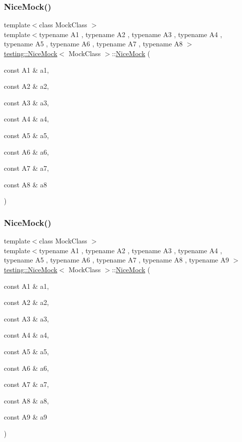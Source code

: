 \subsubsection{\texorpdfstring{Nice\+Mock()}{NiceMock()}\hspace{0.1cm}{\footnotesize\ttfamily [9/11]}}
{\footnotesize\ttfamily template$<$class Mock\+Class $>$ \\
template$<$typename A1 , typename A2 , typename A3 , typename A4 , typename A5 , typename A6 , typename A7 , typename A8 $>$ \\
\hyperlink{classtesting_1_1_nice_mock}{testing\+::\+Nice\+Mock}$<$ Mock\+Class $>$\+::\hyperlink{classtesting_1_1_nice_mock}{Nice\+Mock} (\begin{DoxyParamCaption}\item[{const A1 \&}]{a1,  }\item[{const A2 \&}]{a2,  }\item[{const A3 \&}]{a3,  }\item[{const A4 \&}]{a4,  }\item[{const A5 \&}]{a5,  }\item[{const A6 \&}]{a6,  }\item[{const A7 \&}]{a7,  }\item[{const A8 \&}]{a8 }\end{DoxyParamCaption})\hspace{0.3cm}{\ttfamily [inline]}}

\mbox{\label{classtesting_1_1_nice_mock_a61cfc9282222928590bcdaf851a806c6}} 
\subsubsection{\texorpdfstring{Nice\+Mock()}{NiceMock()}\hspace{0.1cm}{\footnotesize\ttfamily [10/11]}}
{\footnotesize\ttfamily template$<$class Mock\+Class $>$ \\
template$<$typename A1 , typename A2 , typename A3 , typename A4 , typename A5 , typename A6 , typename A7 , typename A8 , typename A9 $>$ \\
\hyperlink{classtesting_1_1_nice_mock}{testing\+::\+Nice\+Mock}$<$ Mock\+Class $>$\+::\hyperlink{classtesting_1_1_nice_mock}{Nice\+Mock} (\begin{DoxyParamCaption}\item[{const A1 \&}]{a1,  }\item[{const A2 \&}]{a2,  }\item[{const A3 \&}]{a3,  }\item[{const A4 \&}]{a4,  }\item[{const A5 \&}]{a5,  }\item[{const A6 \&}]{a6,  }\item[{const A7 \&}]{a7,  }\item[{const A8 \&}]{a8,  }\item[{const A9 \&}]{a9 }\end{DoxyParamCaption})\hspace{0.3cm}{\ttfamily [inline]}}

